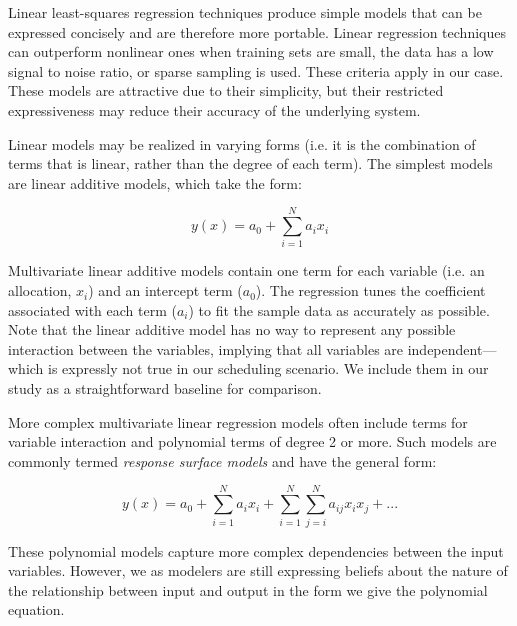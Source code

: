 Linear least-squares regression techniques produce simple models that can be expressed concisely and are therefore more portable. Linear regression techniques can outperform nonlinear ones when training sets are small, the data has a low signal to noise ratio, or sparse sampling is used\cite{hastie}. These criteria apply in our case. These models are attractive due to their simplicity, but their restricted expressiveness may reduce their accuracy of the underlying system.

Linear models may be realized in varying forms (i.e. it is the combination of terms that is linear, rather than the degree of each term).  The simplest models are linear additive models, which take the form:

\begin {equation}
y(x) = a_0 + \sum_{i=1}^{N}{a_ix_i} 
\end {equation}

Multivariate linear additive models contain one term for each variable (i.e. an allocation, $x_i$) and an intercept term ($a_0$).  The regression tunes the coefficient associated with each term ($a_i$) to fit the sample data as accurately as possible.  Note that the linear additive model has no way to represent any possible interaction between the variables, implying that all variables are independent---which is expressly not true in our scheduling scenario.  We include them in our study as a straightforward baseline for comparison.

More complex multivariate linear regression models often include terms for variable interaction and polynomial terms of degree 2 or more.  Such models are commonly termed {\em response surface models} and have the general form:

\begin {equation}
y(x) = a_0 + \sum_{i=1}^{N}{a_ix_i} + \sum_{i = 1}^{N}\sum_{j=i}^{N}{a_{ij}x_ix_j} + ...
\end {equation}

These polynomial models capture more complex dependencies between the input variables.  However, we as modelers are still expressing beliefs about the nature of the relationship between input and output in the form we give the polynomial equation.  


